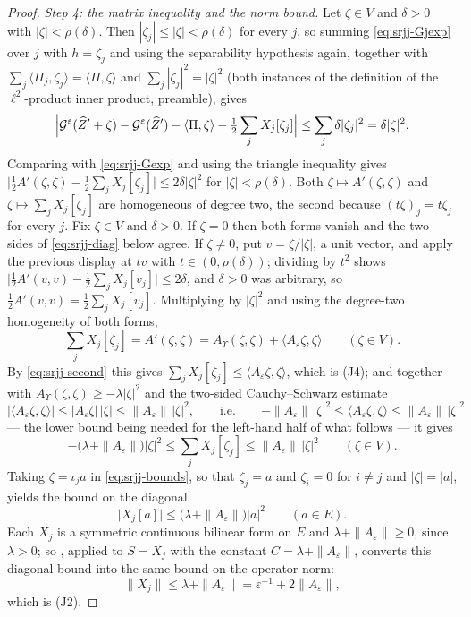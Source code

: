 \begin{proof}
\emph{Step 4: the matrix inequality and the norm bound.}
Let $\zeta\in V$ and $\delta>0$ with $|\zeta|<\rho(\delta)$. Then
$|\zeta_j|\le|\zeta|<\rho(\delta)$ for every $j$, so summing
\eqref{eq:srjj-Gjexp} over $j$ with $h=\zeta_j$ and using the separability
hypothesis again, together with
$\sum_j\langle\Pi_j,\zeta_j\rangle=\langle\Pi,\zeta\rangle$ and
$\sum_j|\zeta_j|^2=|\zeta|^2$ (both instances of the definition of the
$\ell^2$-product inner product, preamble), gives
\[
  \Bigl|\mathcal G^\varepsilon(\widehat Z'+\zeta)
   -\mathcal G^\varepsilon(\widehat Z')-\langle\Pi,\zeta\rangle
   -\tfrac12\sum_jX_j[\zeta_j]\Bigr|\le\sum_j\delta|\zeta_j|^2=\delta|\zeta|^2 .
\]
Comparing with \eqref{eq:srjj-Gexp} and using the triangle inequality gives
$\bigl|\tfrac12A'(\zeta,\zeta)-\tfrac12\sum_jX_j[\zeta_j]\bigr|
\le2\delta|\zeta|^2$ for $|\zeta|<\rho(\delta)$. Both
$\zeta\mapsto A'(\zeta,\zeta)$ and $\zeta\mapsto\sum_jX_j[\zeta_j]$ are
homogeneous of degree two, the second because $(t\zeta)_j=t\zeta_j$ for every
$j$. Fix $\zeta\in V$ and $\delta>0$. If $\zeta=0$ then both forms vanish and
the two sides of \eqref{eq:srjj-diag} below agree. If $\zeta\ne0$, put
$v=\zeta/|\zeta|$, a unit vector, and apply the previous display at $tv$ with
$t\in(0,\rho(\delta))$; dividing by $t^2$ shows
$\bigl|\tfrac12A'(v,v)-\tfrac12\sum_jX_j[v_j]\bigr|\le2\delta$, and
$\delta>0$ was arbitrary, so
$\tfrac12A'(v,v)=\tfrac12\sum_jX_j[v_j]$. Multiplying by $|\zeta|^2$ and using
the degree-two homogeneity of both forms,
\begin{equation}\label{eq:srjj-diag}
  \sum_jX_j[\zeta_j]=A'(\zeta,\zeta)
   =A_\Upsilon(\zeta,\zeta)+\langle A_\varepsilon\zeta,\zeta\rangle
  \qquad(\zeta\in V).
\end{equation}
By \eqref{eq:srjj-second} this gives
$\sum_jX_j[\zeta_j]\le\langle A_\varepsilon\zeta,\zeta\rangle$, which is (J4);
and together with $A_\Upsilon(\zeta,\zeta)\ge-\lambda|\zeta|^2$ and the
two-sided Cauchy--Schwarz estimate
\[
  \bigl|\langle A_\varepsilon\zeta,\zeta\rangle\bigr|
   \le|A_\varepsilon\zeta|\,|\zeta|\le\|A_\varepsilon\|\,|\zeta|^2,
  \qquad\text{i.e.}\qquad
  -\|A_\varepsilon\|\,|\zeta|^2\le\langle A_\varepsilon\zeta,\zeta\rangle
   \le\|A_\varepsilon\|\,|\zeta|^2
\]
--- the lower bound being needed for the left-hand half of what follows --- it
gives
\begin{equation}\label{eq:srjj-bounds}
  -\bigl(\lambda+\|A_\varepsilon\|\bigr)|\zeta|^2
   \le\sum_jX_j[\zeta_j]\le\|A_\varepsilon\|\,|\zeta|^2\qquad(\zeta\in V).
\end{equation}
Taking $\zeta=\iota_ja$ in \eqref{eq:srjj-bounds}, so that $\zeta_j=a$ and
$\zeta_i=0$ for $i\ne j$ and $|\zeta|=|a|$, yields the bound on the diagonal
\[
  \bigl|X_j[a]\bigr|\le\bigl(\lambda+\|A_\varepsilon\|\bigr)|a|^2
  \qquad(a\in E).
\]
Each $X_j$ is a symmetric continuous bilinear form on $E$ and
$\lambda+\|A_\varepsilon\|\ge0$, since $\lambda>0$; so
, applied to $S=X_j$ with the constant
$C=\lambda+\|A_\varepsilon\|$, converts this diagonal bound into the same
bound on the operator norm:
\[
  \|X_j\|\le\lambda+\|A_\varepsilon\|
   =\varepsilon^{-1}+2\|A_\varepsilon\| ,
\]
which is (J2).


\end{proof}
